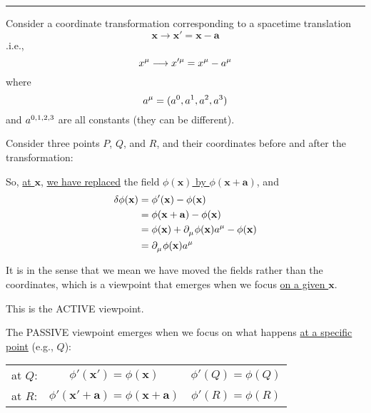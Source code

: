 \documentclass{article}
\begin{document}

\noindent\rule{\textwidth}{.5pt}

\noindent Consider a coordinate transformation corresponding to a spacetime translation
\begin{equation*}
    \mathbf{x} \longrightarrow \mathbf{x}' = \mathbf{x} - \mathbf{a}
\end{equation*}
.i.e.,
\begin{equation*}
    \tensor{x}{^\mu} \longrightarrow \tensor{x}{^\prime^\mu} = \tensor{x}{^\mu} - \tensor{a}{^\mu}
\end{equation*}
where
\begin{equation*}
    \tensor{a}{^\mu} = ( \tensor{a}{^0}, \tensor{a}{^1}, \tensor{a}{^2}, \tensor{a}{^3} )
\end{equation*}
and $\tensor{a}{^0^,^1^,^2^,^3}$ are all constants (they can be different).

\noindent Consider three points $P$, $Q$, and $R$, and their coordinates before and after the transformation:


So, \underline{at $\mathbf{x}$}, \underline{we have replaced} the field \underline{$\phi (\mathbf{x})$ by $\phi ( \mathbf{x} + \mathbf{a} )$}, and
\begin{align*}
    \delta \phi (\mathbf{x}) &= \phi' (\mathbf{x}) - \phi (\mathbf{x}) \\
    &= \phi ( \mathbf{x} + \mathbf{a} ) - \phi (\mathbf{x}) \\
    &= \phi (\mathbf{x}) + \tensor{\partial}{_\mu} \phi (\mathbf{x}) \tensor{a}{^\mu} - \phi (\mathbf{x}) \\
    &= \tensor{\partial}{_\mu} \phi (\mathbf{x}) \tensor{a}{^\mu}
\end{align*}

\noindent It is in the sense that we mean we have moved the fields rather than the coordinates, which is a viewpoint that emerges when we focus \underline{on a given $\mathbf{x}$}.

\noindent This is the ACTIVE viewpoint.

\noindent The PASSIVE viewpoint emerges when we focus on what happens \underline{at a specific} \underline{point} (e.g., $Q$):

\vspace*{-16pt} \begin{center}
\begin{tabular}{lcc}
    at $Q$: & $\phi' (\mathbf{x}') = \phi (\mathbf{x})$ & $\phi' (Q) = \phi(Q)$ \\
    at $R$: & $\phi' ( \mathbf{x}' + \mathbf{a} ) = \phi ( \mathbf{x} + \mathbf{a} )$ & $\phi' (R) = \phi (R)$
\end{tabular}
\end{center} \vspace*{-16pt}
\end{document}
